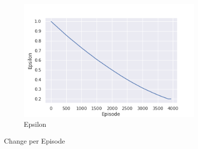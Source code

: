 \begin{appendices}
\begin{figure}[h]
\begin{subfigure}{0.49\linewidth}
            \includegraphics[width=\linewidth, height=0.3\textheight, keepaspectratio]{img/result_img/epsilon.png}
            \caption{Epsilon}
        \end{subfigure}

        \caption{Change per Episode}\label{fig:results}
    \end{figure}
\end{appendices}